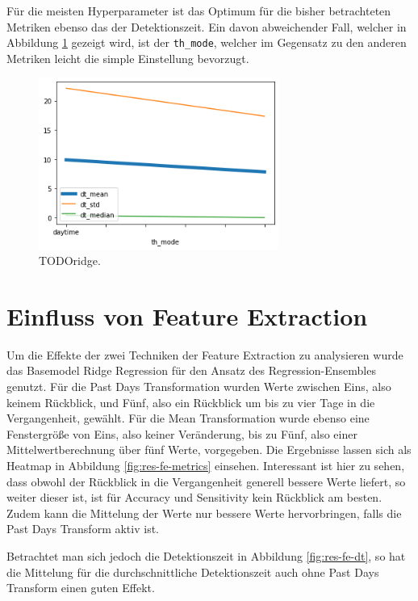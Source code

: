 Für die meisten Hyperparameter ist das Optimum für die bisher betrachteten Metriken ebenso das der
 Detektionszeit. Ein davon abweichender Fall, welcher in Abbildung \ref{fig:res-fe-th-mode} gezeigt wird, ist der
 \texttt{th\_mode}, welcher im Gegensatz zu den anderen Metriken leicht die simple Einstellung bevorzugt.

\begin{figure}
    \centering
    \includegraphics[width=0.7\textwidth]{res/res-fe-th-mode}
    \caption{TODOridge.}
    \label{fig:res-fe-th-mode}
\end{figure}

\section{Einfluss von Feature Extraction}

Um die Effekte der zwei Techniken der Feature Extraction zu analysieren wurde das Basemodel Ridge Regression
 für den Ansatz des Regression-Ensembles genutzt. Für die Past Days Transformation wurden Werte zwischen Eins,
 also keinem Rückblick, und Fünf, also ein Rückblick um bis zu vier Tage in die Vergangenheit, gewählt. Für
 die Mean Transformation wurde ebenso eine Fenstergröße von Eins, also keiner Veränderung, bis zu Fünf, also
 einer Mittelwertberechnung über fünf Werte, vorgegeben. Die Ergebnisse lassen sich als Heatmap in
 Abbildung \ref{fig:res-fe-metrics} einsehen. Interessant ist hier zu sehen, dass obwohl der Rückblick in die Vergangenheit generell
 bessere Werte liefert, so weiter dieser ist, ist für Accuracy und Sensitivity kein Rückblick am besten. Zudem
 kann die Mittelung der Werte nur bessere Werte hervorbringen, falls die Past Days Transform aktiv ist.

Betrachtet man sich jedoch die Detektionszeit in Abbildung \ref{fig:res-fe-dt}, so hat die Mittelung für die
 durchschnittliche Detektionszeit auch ohne Past Days Transform einen guten Effekt.

